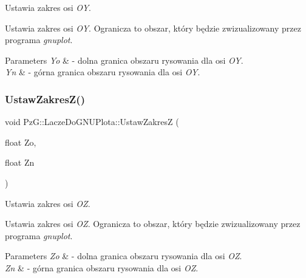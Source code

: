 Ustawia zakres osi {\itshape OY}. 

Ustawia zakres osi {\itshape OY}. Ogranicza to obszar, który będzie zwizualizowany przez programa {\itshape gnuplot}. 
\begin{DoxyParams}{Parameters}
{\em Yo} & -\/ dolna granica obszaru rysowania dla osi {\itshape OY}. \\
\hline
{\em Yn} & -\/ górna granica obszaru rysowania dla osi {\itshape OY}. \\
\hline
\end{DoxyParams}
\mbox{\label{classPzG_1_1LaczeDoGNUPlota_a1dbbb2b86fb13b8632e6bad9df2a82e3}} 
\subsubsection{\texorpdfstring{Ustaw\+Zakres\+Z()}{UstawZakresZ()}}
{\footnotesize\ttfamily void Pz\+G\+::\+Lacze\+Do\+G\+N\+U\+Plota\+::\+Ustaw\+ZakresZ (\begin{DoxyParamCaption}\item[{float}]{Zo,  }\item[{float}]{Zn }\end{DoxyParamCaption})\hspace{0.3cm}{\ttfamily [inline]}}



Ustawia zakres osi {\itshape OZ}. 

Ustawia zakres osi {\itshape OZ}. Ogranicza to obszar, który będzie zwizualizowany przez programa {\itshape gnuplot}. 
\begin{DoxyParams}{Parameters}
{\em Zo} & -\/ dolna granica obszaru rysowania dla osi {\itshape OZ}. \\
\hline
{\em Zn} & -\/ górna granica obszaru rysowania dla osi {\itshape OZ}. \\
\hline
\end{DoxyParams}
\mbox{\label{classPzG_1_1LaczeDoGNUPlota_a75f599f17413ea8602c6dbba09f36407}} 
